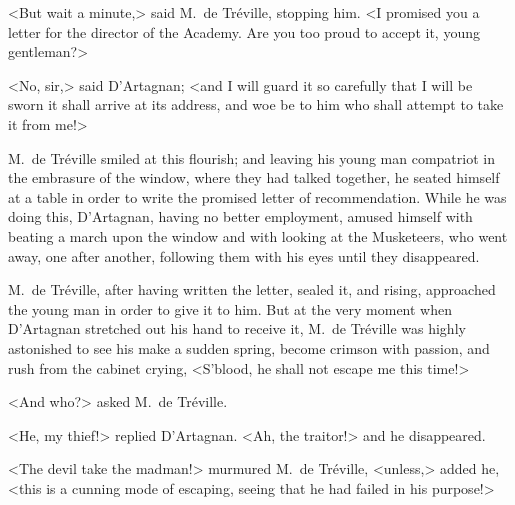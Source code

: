 <But wait a minute,> said M.~de Tréville, stopping him. <I promised you a letter for the director of the Academy. Are you too proud to accept it, young gentleman?> 

<No, sir,> said D'Artagnan; <and I will guard it so carefully that I will be sworn it shall arrive at its address, and woe be to him who shall attempt to take it from me!> 

M.~de Tréville smiled at this flourish; and leaving his young man compatriot in the embrasure of the window, where they had talked together, he seated himself at a table in order to write the promised letter of recommendation. While he was doing this, D'Artagnan, having no better employment, amused himself with beating a march upon the window and with looking at the Musketeers, who went away, one after another, following them with his eyes until they disappeared. 

M.~de Tréville, after having written the letter, sealed it, and rising, approached the young man in order to give it to him. But at the very moment when D'Artagnan stretched out his hand to receive it, M.~de Tréville was highly astonished to see his  make a sudden spring, become crimson with passion, and rush from the cabinet crying, <S'blood, he shall not escape me this time!> 

<And who?> asked M.~de Tréville. 

<He, my thief!> replied D'Artagnan. <Ah, the traitor!> and he disappeared. 

<The devil take the madman!> murmured M.~de Tréville, <unless,> added he, <this is a cunning mode of escaping, seeing that he had failed in his purpose!> 